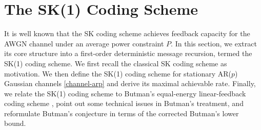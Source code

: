 \documentclass[12pt]{article}
\newcommand{\EX}{{\mathbb{E}}}
\begin{document}



\section{The SK(1) Coding Scheme}
It is well known that the SK coding scheme achieves feedback capacity for the AWGN channel under an average power constraint $P$. In this section, we extract its core structure into a first-order deterministic message recursion, termed the SK(1) coding scheme. We first recall the classical SK coding scheme as motivation. We then define the SK(1) coding scheme for stationary AR($p$) Gaussian channels \eqref{channel-arp} and derive its maximal achievable rate. Finally, we relate the SK(1) coding scheme to Butman's equal-energy linear-feedback coding scheme \cite{butman1976linear}, point out some technical issues in Butman's treatment, and reformulate Butman's conjecture in terms of the corrected Butman's lower bound.
\end{document}
